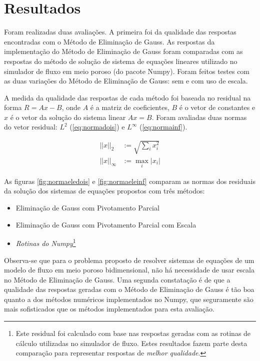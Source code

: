 \documentclass[final,5p]{elsarticle}
\numberwithin{equation}{section}
\begin{document}
\section{Resultados}

        Foram realizadas duas avaliações. A primeira foi da qualidade das respostas encontradas com o Método de Eliminação de Gauss. As respostas da implementação do Método de Eliminação de Gauss foram comparadas com as respostas do método de solução de sistema de equações lineares utilizado no simulador de fluxo em meio poroso (do pacote Numpy). Foram feitos testes com as duas variações do Método de Eliminação de Gauss: sem e com uso de escala.

        A medida da qualidade das respostas de cada método foi baseada no residual na forma $R = Ax-B$, onde $A$ é a matriz de coeficientes, $B$ é o vetor de constantes e $x$ é o vetor da solução do sistema linear $Ax=B$. Foram avaliadas duas normas do vetor residual: $L^2$ (\ref{eq:normadois}) e $L^\infty$ (\ref{eq:normainf}).

        \begin{align}
            ||x||_2 &:= \sqrt{\sum_{i}x_i^2} \label{eq:normadois} \\
            ||x||_\infty &:= \max_{i} |x_i| \label{eq:normainf}
        \end{align}

        As figuras \ref{fig:normaeledois} e \ref{fig:normaeleinf} comparam as normas dos residuais da solução dos sistemas de equações propostos com três métodos:
        \begin{itemize}
            \item Eliminação de Gauss com Pivotamento Parcial
            \item Eliminação de Gauss com Pivotamento Parcial com Escala
            \item \emph{Rotinas do Numpy}\footnote{Este residual foi calculado com base nas respostas geradas com as rotinas de cálculo utilizadas no simulador de fluxo. Estes resultados fazem parte desta comparação para representar respostas de \emph{melhor qualidade}.}
        \end{itemize}

        Observa-se que para o problema proposto de resolver sistemas de equações de um modelo de fluxo em meio poroso bidimensional, não há necessidade de usar escala no Método de Eliminação de Gauss. Uma segunda constatação é de que a qualidade das respostas geradas com o Método de Eliminação de Gauss é tão boa quanto a dos métodos numéricos implementados no Numpy, que seguramente são mais sofisticados que os métodos implementados para esta avaliação.
\end{document}
